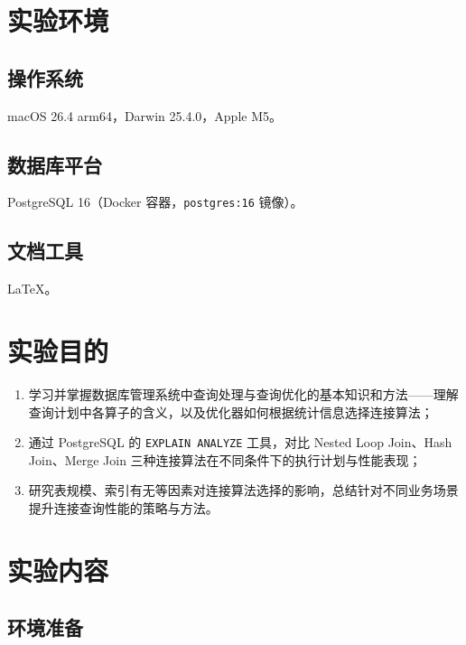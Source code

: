 \documentclass[12pt, a4paper]{academics}
\begin{document}
\def\PYGZus{\textunderscore}

\makeacademicscover

\section{实验环境}

\subsection{操作系统}

macOS 26.4 arm64，Darwin 25.4.0，Apple M5。

\subsection{数据库平台}

PostgreSQL 16（Docker 容器，\texttt{postgres:16} 镜像）。

\subsection{文档工具}

\LaTeX{}。

\section{实验目的}

\begin{enumerate}
    \item 学习并掌握数据库管理系统中查询处理与查询优化的基本知识和方法——理解查询计划中各算子的含义，以及优化器如何根据统计信息选择连接算法；
    \item 通过 PostgreSQL 的 \texttt{EXPLAIN ANALYZE} 工具，对比 Nested Loop Join、Hash Join、Merge Join 三种连接算法在不同条件下的执行计划与性能表现；
    \item 研究表规模、索引有无等因素对连接算法选择的影响，总结针对不同业务场景提升连接查询性能的策略与方法。
\end{enumerate}

\section{实验内容}

\subsection{环境准备}
\end{document}
